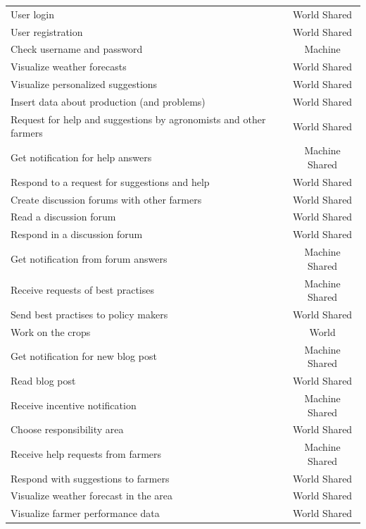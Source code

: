 \documentclass{article}
\begin{document}
    \begin{table}[h]
        \centering
        \begin{tabular}{l|c}
        \hline
            User login & World Shared \\
            User registration & World Shared \\
            Check username and password & Machine \\
        \hline
            Visualize weather forecasts & World Shared \\
            Visualize personalized suggestions & World Shared \\
            Insert data about production (and problems) & World Shared \\
            Request for help and suggestions by agronomists and other farmers & World Shared\\
            Get notification for help answers & Machine Shared \\
            Respond to a request for suggestions and help & World Shared\\
            Create discussion forums with other farmers & World Shared\\
            Read a discussion forum & World Shared\\
            Respond in a discussion forum & World Shared\\
            Get notification from forum answers & Machine Shared\\
            Receive requests of best practises & Machine Shared\\
            Send best practises to policy makers & World Shared\\
            Work on the crops & World \\
            Get notification for new blog post & Machine Shared \\
            Read blog post & World Shared \\
            Receive incentive notification & Machine Shared \\
        \hline
            Choose responsibility area & World Shared \\
            Receive help requests from farmers & Machine Shared \\
            Respond with suggestions to farmers & World Shared \\
            Visualize weather forecast in the area & World Shared \\
            Visualize farmer performance data & World Shared \\

\end{tabular}
\end{table}
\end{document}
